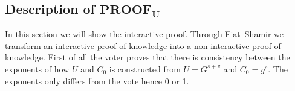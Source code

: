 \subsection{Description of $ \mathbf{PROOF_U} $}
In this section we will show the interactive proof. Through Fiat–Shamir  we transform an interactive proof of knowledge into a non-interactive proof of knowledge. First of all the voter proves that there is consistency between the exponents of how \begin{math}U\end{math} and \begin{math}C_0\end{math} is constructed from \begin{math}U=G^{s+v}\end{math} and \begin{math}C_0 = g^s\end{math}. The exponents only differs from the vote hence 0 or 1.\\

